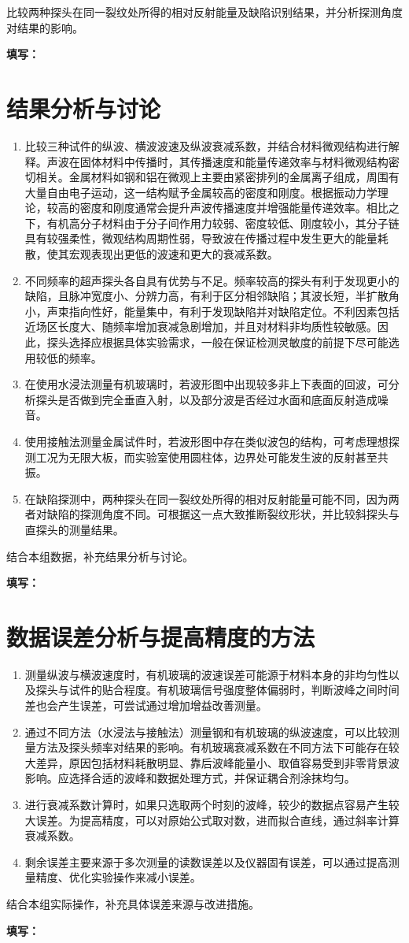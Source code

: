 \documentclass[UTF8,a4paper,12pt]{ctexart}
\newcommand{\blank}[1][2.5cm]{\mbox{\underline{\hspace{#1}}}}
\newcommand{\answer}{\par\noindent\textbf{填写：}\blank[0.86\textwidth]\par}
\numberwithin{equation}{section}
\begin{document}
比较两种探头在同一裂纹处所得的相对反射能量及缺陷识别结果，并分析探测角度对结果的影响。
\answer

\section{结果分析与讨论}
\begin{enumerate}
  \item 比较三种试件的纵波、横波波速及纵波衰减系数，并结合材料微观结构进行解释。声波在固体材料中传播时，其传播速度和能量传递效率与材料微观结构密切相关。金属材料如钢和铝在微观上主要由紧密排列的金属离子组成，周围有大量自由电子运动，这一结构赋予金属较高的密度和刚度。根据振动力学理论，较高的密度和刚度通常会提升声波传播速度并增强能量传递效率。相比之下，有机高分子材料由于分子间作用力较弱、密度较低、刚度较小，其分子链具有较强柔性，微观结构周期性弱，导致波在传播过程中发生更大的能量耗散，使其宏观表现出更低的波速和更大的衰减系数。
  \item 不同频率的超声探头各自具有优势与不足。频率较高的探头有利于发现更小的缺陷，且脉冲宽度小、分辨力高，有利于区分相邻缺陷；其波长短，半扩散角小，声束指向性好，能量集中，有利于发现缺陷并对缺陷定位。不利因素包括近场区长度大、随频率增加衰减急剧增加，并且对材料非均质性较敏感。因此，探头选择应根据具体实验需求，一般在保证检测灵敏度的前提下尽可能选用较低的频率。
  \item 在使用水浸法测量有机玻璃时，若波形图中出现较多非上下表面的回波，可分析探头是否做到完全垂直入射，以及部分波是否经过水面和底面反射造成噪音。
  \item 使用接触法测量金属试件时，若波形图中存在类似波包的结构，可考虑理想探测工况为无限大板，而实验室使用圆柱体，边界处可能发生波的反射甚至共振。
  \item 在缺陷探测中，两种探头在同一裂纹处所得的相对反射能量可能不同，因为两者对缺陷的探测角度不同。可根据这一点大致推断裂纹形状，并比较斜探头与直探头的测量结果。
\end{enumerate}
结合本组数据，补充结果分析与讨论。
\answer

\section{数据误差分析与提高精度的方法}
\begin{enumerate}
  \item 测量纵波与横波速度时，有机玻璃的波速误差可能源于材料本身的非均匀性以及探头与试件的贴合程度。有机玻璃信号强度整体偏弱时，判断波峰之间时间差也会产生误差，可尝试通过增加增益改善测量。
  \item 通过不同方法（水浸法与接触法）测量钢和有机玻璃的纵波速度，可以比较测量方法及探头频率对结果的影响。有机玻璃衰减系数在不同方法下可能存在较大差异，原因包括材料耗散明显、靠后波峰能量小、取值容易受到非零背景波影响。应选择合适的波峰和数据处理方式，并保证耦合剂涂抹均匀。
  \item 进行衰减系数计算时，如果只选取两个时刻的波峰，较少的数据点容易产生较大误差。为提高精度，可以对原始公式取对数，进而拟合直线，通过斜率计算衰减系数。
  \item 剩余误差主要来源于多次测量的读数误差以及仪器固有误差，可以通过提高测量精度、优化实验操作来减小误差。
\end{enumerate}
结合本组实际操作，补充具体误差来源与改进措施。
\answer
\end{document}

